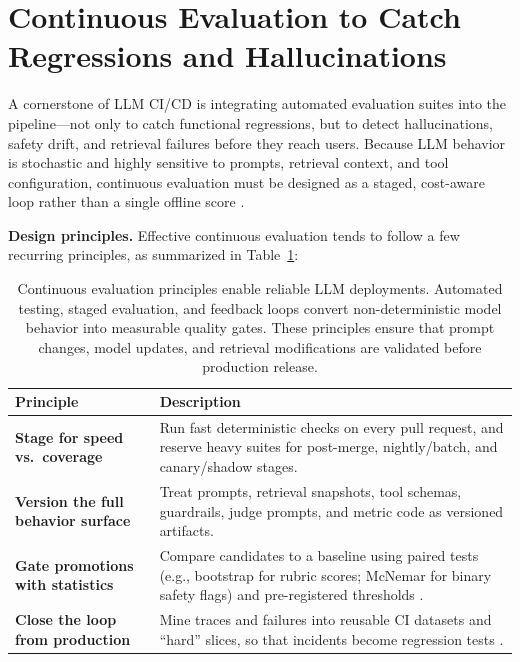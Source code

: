 \section{Continuous Evaluation to Catch Regressions and Hallucinations}
\label{sec:cicd-continuous-eval}
A cornerstone of LLM CI/CD is integrating automated evaluation suites into the pipeline---not only to catch functional regressions, but to detect hallucinations, safety drift, and retrieval failures before they reach users. Because LLM behavior is stochastic and highly sensitive to prompts, retrieval context, and tool configuration, continuous evaluation must be designed as a staged, cost-aware loop rather than a single offline score \cite{helm}.

\noindent\textbf{Design principles.} Effective continuous evaluation tends to follow a few recurring principles, as summarized in Table~\ref{tab:ch04_eval_design_principles}:

\begin{table}[t]
\centering
\small
\caption{Continuous evaluation principles enable reliable LLM deployments. Automated testing, staged evaluation, and feedback loops convert non-deterministic model behavior into measurable quality gates. These principles ensure that prompt changes, model updates, and retrieval modifications are validated before production release.}
\label{tab:ch04_eval_design_principles}
\setlength{\tabcolsep}{6pt}
\renewcommand{\arraystretch}{1.3}
\begin{tabularx}{\linewidth}{@{}p{3.5cm}X@{}}
\toprule
\rowcolor{gray!15}
\textbf{Principle} & \textbf{Description} \\
\midrule
\textbf{Stage for speed vs.~coverage} & Run fast deterministic checks on every pull request, and reserve heavy suites for post-merge, nightly/batch, and canary/shadow stages. \\
\textbf{Version the full behavior surface} & Treat prompts, retrieval snapshots, tool schemas, guardrails, judge prompts, and metric code as versioned artifacts. \\
\textbf{Gate promotions with statistics} & Compare candidates to a baseline using paired tests (e.g., bootstrap for rubric scores; McNemar for binary safety flags) and pre-registered thresholds \cite{koehn2004,mcnemar1947}. \\
\textbf{Close the loop from production} & Mine traces and failures into reusable CI datasets and ``hard'' slices, so that incidents become regression tests \cite{phoenix_rag,trulens}. \\
\bottomrule
\end{tabularx}
\end{table}

